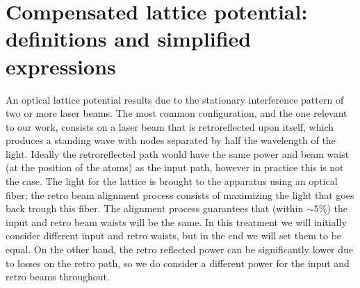 %

\section{Compensated lattice potential: definitions and simplified expressions}
\label{sec:complatt}

An optical lattice potential results due to the stationary interference pattern
of two or more laser beams.   The most common configuration, and the one
relevant to our work, consists on a laser beam that is retroreflected upon
itself, which produces a standing wave with nodes separated by half the
wavelength of the light.   Ideally the retroreflected path would have the same
power and beam waist (at the position of the atoms) as the input path, however
in practice this is not the case.   The light for the lattice is brought to the
apparatus using an optical fiber; the retro beam alignment process consists of
maximizing the light that goes back trough this fiber.   The alignment process
guarantees that (within $\sim$5\%) the input and retro beam waists will be the
same. In this treatment we will initially consider different input and retro
waists, but in the end we will set them to be equal.   On the other hand, the
retro reflected power can be significantly lower due to losses on the retro
path, so we do consider a different power for the input and retro beams
throughout. 

